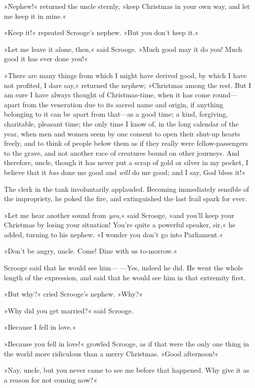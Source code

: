 »Nephew!« returned the uncle sternly, »keep Christmas in your own way, and let me keep it in mine.«

»Keep it!« repeated Scrooge's nephew. »But you don't keep it.«

»Let me leave it alone, then,« said Scrooge. »Much good may it do you! Much good it has ever done you!«

»There are many things from which I might have derived good, by which I have not profited, I dare say,« returned the nephew; »Christmas among the rest. But I am sure I have always thought of Christmas-time, when it has come round—apart from the veneration due to its sacred name and origin, if anything belonging to it can be apart from that—as a good time; a kind, forgiving, charitable, pleasant time; the only time I know of, in the long calendar of the year, when men and women seem by one consent to open their shut-up hearts freely, and to think of people below them as if they really were fellow-passengers to the grave, and not another race of creatures bound on other journeys. And therefore, uncle, though it has never put a scrap of gold or silver in my pocket, I believe that it \textit{has} done me good and \textit{will} do me good; and I say, God bless it!«

The clerk in the tank involuntarily applauded. Becoming immediately sensible of the impropriety, he poked the fire, and extinguished the last frail spark for ever.

»Let me hear another sound from \textit{you},« said Scrooge, »and you'll keep your Christmas by losing your situation! You're quite a powerful speaker, sir,« he added, turning to his nephew. »I wonder you don't go into Parliament.«

»Don't be angry, uncle. Come! Dine with us to-morrow.«

Scrooge said that he would see him— —Yes, indeed he did. He went the whole length of the expression, and said that he would see him in that extremity first.

»But why?« cried Scrooge's nephew. »Why?«

»Why did you get married?« said Scrooge.

»Because I fell in love.«

»Because you fell in love!« growled Scrooge, as if that were the only one thing in the world more ridiculous than a merry Christmas. »Good afternoon!«

»Nay, uncle, but you never came to see me before that happened. Why give it as a reason for not coming now?«

